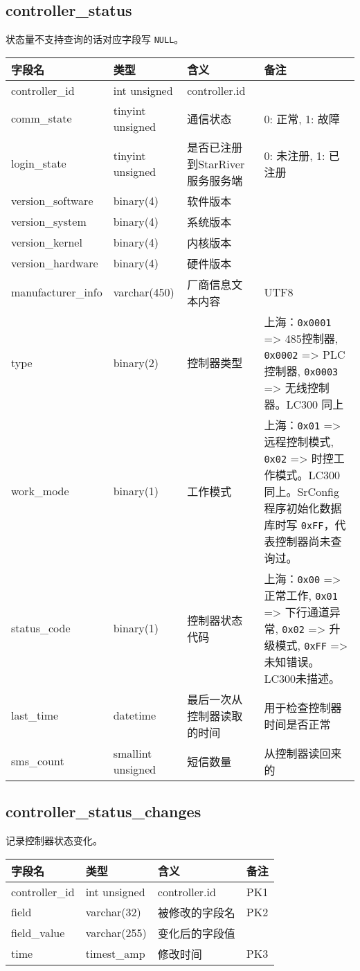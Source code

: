 \subsection{controller\_status}\label{controllerux5fstatus}

状态量不支持查询的话对应字段写 \texttt{NULL}。

\begin{longtabu}[c]{@{}lXXX@{}}
\toprule
字段名 & 类型 & 含义 & 备注\tabularnewline
\midrule
\endhead
controller\_id & int unsigned & controller.id &\tabularnewline
comm\_state & tinyint unsigned & 通信状态 & 0: 正常, 1:
故障\tabularnewline
login\_state & tinyint unsigned & 是否已注册到StarRiver服务服务端 & 0:
未注册, 1: 已注册\tabularnewline
version\_software & binary(4) & 软件版本 &\tabularnewline
version\_system & binary(4) & 系统版本 &\tabularnewline
version\_kernel & binary(4) & 内核版本 &\tabularnewline
version\_hardware & binary(4) & 硬件版本 &\tabularnewline
manufacturer\_info & varchar(450) & 厂商信息文本内容 &
UTF8\tabularnewline
type & binary(2) & 控制器类型 & 上海：\texttt{0x0001} =\textgreater{}
485控制器, \texttt{0x0002} =\textgreater{} PLC控制器, \texttt{0x0003}
=\textgreater{} 无线控制器。LC300 同上\tabularnewline
work\_mode & binary(1) & 工作模式 & 上海：\texttt{0x01} =\textgreater{}
远程控制模式, \texttt{0x02} =\textgreater{}
时控工作模式。LC300同上。SrConfig程序初始化数据库时写
\texttt{0xFF}，代表控制器尚未查询过。\tabularnewline
status\_code & binary(1) & 控制器状态代码 & 上海：\texttt{0x00}
=\textgreater{} 正常工作, \texttt{0x01} =\textgreater{} 下行通道异常,
\texttt{0x02} =\textgreater{} 升级模式, \texttt{0xFF} =\textgreater{}
未知错误。LC300未描述。\tabularnewline
last\_time & datetime & 最后一次从控制器读取的时间 &
用于检查控制器时间是否正常\tabularnewline
sms\_count & smallint unsigned & 短信数量 &
从控制器读回来的\tabularnewline
\bottomrule
\end{longtabu}

\subsection{controller\_status\_changes}\label{controllerux5fstatusux5fchanges}

记录控制器状态变化。

\begin{longtabu}[c]{@{}lXXX@{}}
\toprule
字段名 & 类型 & 含义 & 备注\tabularnewline
\midrule
\endhead
controller\_id & int unsigned & controller.id & PK1\tabularnewline
field & varchar(32) & 被修改的字段名 & PK2\tabularnewline
field\_value & varchar(255) & 变化后的字段值 &\tabularnewline
time & timest\_amp & 修改时间 & PK3\tabularnewline
\bottomrule
\end{longtabu}

